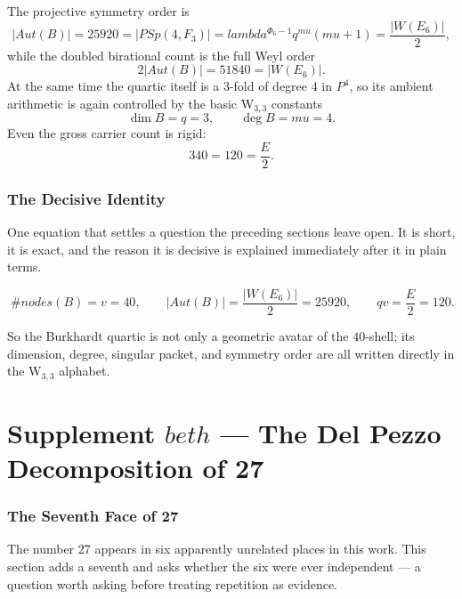 \documentclass[12pt,a4paper]{article}
\def\mathbb#1{#1}%
\def\mathrm#1{#1}%
\def\mathbf#1{#1}%
\def\mathcal#1{#1}%
\def\lambda{lambda}%
\def\mu{mu}%
\def\Phi#1{Phi#1}%
\def\beth{beth}%
\def\cdot{ }%
\theoremstyle{definition}
\newcommand{\PSp}{\mathrm{PSp}}
\newcommand{\Aut}{\mathrm{Aut}}
\newcommand{\FF}{\mathbb{F}}
\begin{document}
The projective symmetry order is
\[
|\Aut(\mathcal B)| = 25920 = |\PSp(4,\FF_3)| = \lambda^{\Phi_6-1}q^{\mu}(\mu+1)
= \frac{|W(E_6)|}{2},
\]
while the doubled birational count is the full Weyl order
\[
2|\Aut(\mathcal B)| = 51840 = |W(E_6)|.
\]
At the same time the quartic itself is a $3$-fold of degree $4$ in
$\mathbf P^4$, so its ambient arithmetic is again controlled by the basic
W$_{3,3}$ constants
\[
\dim \mathcal B = q = 3,
\qquad
\deg \mathcal B = \mu = 4.
\]
Even the gross carrier count is rigid:
\[
3\cdot 40 = 120 = \frac{E}{2}.
\]

\section*{The Decisive Identity}

\begin{plainbox}
One equation that settles a question the preceding sections leave open. It is short,
it is exact, and the reason it is decisive is explained immediately after it in plain
terms.
\end{plainbox}


\[
\boxed{\;
\#\mathrm{nodes}(\mathcal B) = v = 40,
\qquad
|\Aut(\mathcal B)| = \frac{|W(E_6)|}{2} = 25920,
\qquad
qv = \frac{E}{2} = 120.
\;}
\]

So the Burkhardt quartic is not only a geometric avatar of the $40$-shell; its
dimension, degree, singular packet, and symmetry order are all written directly
in the W$_{3,3}$ alphabet.

\clearpage
\part*{\texorpdfstring{Supplement $\beth$ --- The Del Pezzo Decomposition of 27}{Supplement beth --- The Del Pezzo Decomposition of 27}}

\section*{The Seventh Face of 27}

\begin{plainbox}
The number 27 appears in six apparently unrelated places in this work. This section
adds a seventh and asks whether the six were ever independent --- a question worth asking
before treating repetition as evidence.
\end{plainbox}
\end{document}
